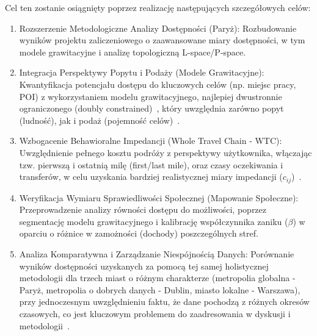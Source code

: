 \documentclass[12pt]{article}
\begin{document}
Cel ten zostanie osiągnięty poprzez realizację następujących szczegółowych celów:
\begin{enumerate}
    \item Rozszerzenie Metodologiczne Analizy Dostępności (Paryż): Rozbudowanie wyników projektu zaliczeniowego o zaawansowane miary dostępności, w tym modele grawitacyjne i analizę topologiczną L-space/P-space.
    \item Integracja Perspektywy Popytu i Podaży (Modele Grawitacyjne): Kwantyfikacja potencjału dostępu do kluczowych celów (np. miejsc pracy, POI) z wykorzystaniem modelu grawitacyjnego, najlepiej dwustronnie ograniczonego (doubly constrained)~\cite{trzy}, który uwzględnia zarówno popyt (ludność), jak i podaż (pojemność celów)~\cite{trzy}.
    \item Wzbogacenie Behawioralne Impedancji (Whole Travel Chain - WTC): Uwzględnienie pełnego kosztu podróży z perspektywy użytkownika, włączając tzw. pierwszą i ostatnią milę (first/last mile), oraz czasy oczekiwania i transferów, w celu uzyskania bardziej realistycznej miary impedancji ($c_{ij}$)~\cite{dziewiec}.
    \item Weryfikacja Wymiaru Sprawiedliwości Społecznej (Mapowanie Społeczne): Przeprowadzenie analizy równości dostępu do możliwości, poprzez segmentację modelu grawitacyjnego i kalibrację współczynnika zaniku ($\beta$) w oparciu o różnice w zamożności (dochody) poszczególnych stref.
    \item Analiza Komparatywna i Zarządzanie Niespójnością Danych: Porównanie wyników dostępności uzyskanych za pomocą tej samej holistycznej metodologii dla trzech miast o różnym charakterze (metropolia globalna - Paryż, metropolia o dobrych danych - Dublin, miasto lokalne - Warszawa), przy jednoczesnym uwzględnieniu faktu, że dane pochodzą z różnych okresów czasowych, co jest kluczowym problemem do zaadresowania w dyskusji i metodologii~\cite{dwanascie}.
\end{enumerate}
\end{document}
